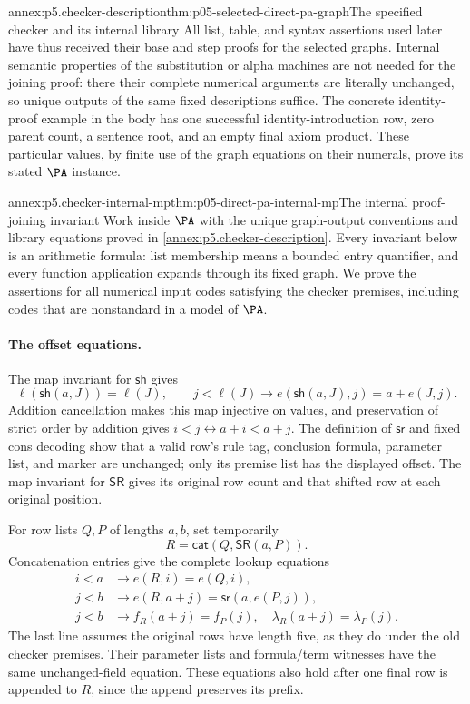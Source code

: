 \begin{annexitem}{annex:p5.checker-description}{thm:p05-selected-direct-pa-graph}{The specified checker and its internal library}
All list, table, and syntax assertions used later have thus received their
base and step proofs for the selected graphs.  Internal semantic properties
of the substitution or alpha machines are not needed for the joining proof:
there their complete numerical arguments are literally unchanged, so unique
outputs of the same fixed descriptions suffice.  The concrete identity-proof
example in the body has one successful identity-introduction row, zero parent
count, a sentence root, and an empty final axiom product.  These particular
values, by finite use of the graph equations on their numerals, prove its
stated \(\PA\) instance.
\end{annexitem}

\begin{annexitem}{annex:p5.checker-internal-mp}{thm:p05-direct-pa-internal-mp}{The internal proof-joining invariant}
Work inside \(\PA\) with the unique graph-output conventions and library
equations proved in \cref{annex:p5.checker-description}.  Every invariant
below is an arithmetic formula: list membership means a bounded entry
quantifier, and every function application expands through its fixed graph.
We prove the assertions for all numerical input codes satisfying the checker
premises, including codes that are nonstandard in a model of \(\PA\).

\paragraph{The offset equations.}
The map invariant for \(\mathsf{sh}\) gives
\[
 \ell(\mathsf{sh}(a,J))=\ell(J),\qquad
 j<\ell(J)\to e(\mathsf{sh}(a,J),j)=a+e(J,j).
\]
Addition cancellation makes this map injective on values, and preservation
of strict order by addition gives
\(i<j\leftrightarrow a+i<a+j\).  The definition of \(\mathsf{sr}\)
and fixed cons decoding show that a valid row's rule tag, conclusion formula,
parameter list, and marker are unchanged; only its premise list has the
displayed offset.  The map invariant for \(\mathsf{SR}\) gives its original
row count and that shifted row at each original position.

For row lists \(Q,P\) of lengths \(a,b\), set temporarily
\[
 R=\mathsf{cat}(Q,\mathsf{SR}(a,P)).
\]
Concatenation entries give the complete lookup equations
\[
\begin{aligned}
 i<a&\to e(R,i)=e(Q,i),\\
 j<b&\to e(R,a+j)=\mathsf{sr}(a,e(P,j)),\\
 j<b&\to f_R(a+j)=f_P(j),\quad
                       \lambda_R(a+j)=\lambda_P(j).
\end{aligned}
\]
The last line assumes the original rows have length five, as they do under
the old checker premises.  Their parameter lists and formula/term witnesses
have the same unchanged-field equation.  These equations also hold after
one final row is appended to \(R\), since the append preserves its prefix.


\end{annexitem}
